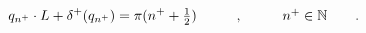 \begin{equation}
q_{n^+}\cdot L+\delta^+(q_{n^+})=\pi(n^++\textstyle\frac{1}{2})
\hspace{1cm},\hspace{1cm} n^+\in {\Bbb N}\qquad .
\end{equation}


